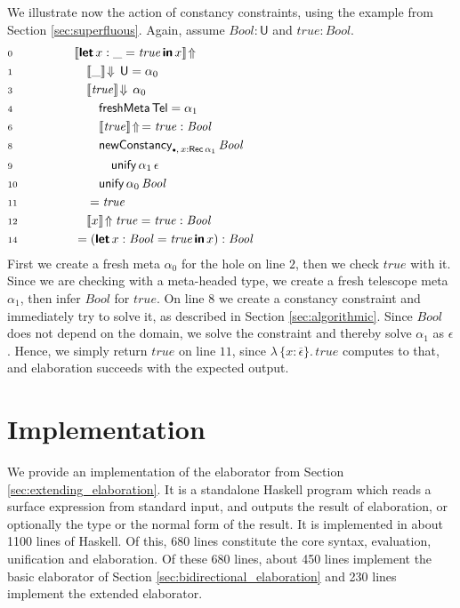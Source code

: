 \documentclass[acmsmall,review,anonymous,prologue,dvipsnames]{acmart}\settopmatter{printfolios=true,printccs=false,printacmref=false}
\newcommand{\slet}{\boldsymbol{\mathsf{let}}}
\renewcommand{\sin}{\boldsymbol{\mathsf{in}}}
\renewcommand{\U}{\mathsf{U}}
\newcommand{\emptycon}{\scaleobj{.75}\bullet}
\newcommand{\unify}{\mathsf{unify}}
\newcommand{\mi}[1]{\mathit{#1}}
\newcommand{\echeckt}[2]{\llbracket#1\rrbracket\!\Downarrow\,#2}
\newcommand{\einfert}[1]{\llbracket#1\rrbracket\!\Uparrow}
\newcommand{\Tel}{\mathsf{Tel}}
\newcommand{\Rec}{\mathsf{Rec}}
\newcommand{\ol}[1]{\overline{#1}}
\theoremstyle{remark}
\begin{document}
\begin{example}
We illustrate now the action of constancy constraints, using the example from
Section \ref{sec:superfluous}. Again, assume $\mi{Bool} : \U$ and $\mi{true} : \mi{Bool}$.
\begin{alignat*}{3}
& \scriptstyle{0}\qquad\qquad && \einfert{\slet\,x : \_ = \mi{true}\,\sin\,x}
      \hspace{21em}\\
& \scriptstyle{1} && \quad \echeckt{\_}{\U} = \alpha_0\\
& \scriptstyle{3} && \quad \echeckt{\mi{true}}{\alpha_0}\\
& \scriptstyle{4} && \qquad \mathsf{freshMeta}\,\Tel = \alpha_1\\
& \scriptstyle{6} && \qquad \einfert{\mi{true}}\,= \mi{true} : \mi{Bool}\\
& \scriptstyle{8} && \qquad \mathsf{newConstancy}_{\emptycon,\,x : \Rec\,\alpha_1}\,\mi{Bool}\\
& \scriptstyle{9} && \qquad\quad \unify\,\alpha_1\,\epsilon\\
& \scriptstyle{10} && \qquad \unify\,\alpha_0\,\mi{Bool}\\
& \scriptstyle{11} && \quad = \mi{true}\\
& \scriptstyle{12} && \quad \einfert{x}{\mi{true}} = \mi{true} : \mi{Bool}\\
& \scriptstyle{14} && = (\slet\,x : \mi{Bool} = \mi{true}\,\sin\,x) : \mi{Bool}
\end{alignat*}
First we create a fresh meta $\alpha_0$ for the hole on line $\scriptstyle{2}$,
then we check $\mi{true}$ with it. Since we are checking with a meta-headed type, we
create a fresh telescope meta $\alpha_1$, then infer $\mi{Bool}$ for
$\mi{true}$. On line $\scriptstyle{8}$ we create a constancy constraint and
immediately try to solve it, as described in Section
\ref{sec:algorithmic}. Since $\mi{Bool}$ does not depend on the domain, we solve
the constraint and thereby solve $\alpha_1$ as $\epsilon$. Hence, we simply
return $\mi{true}$ on line $\scriptstyle{11}$, since $\lambda\,\{x :
\ol{\epsilon}\}.\,\mi{true}$ computes to that, and elaboration succeeds with the
expected output.
\end{example}

\section{Implementation}
\label{sec:impl_and_eval}

We provide an implementation of the elaborator from Section
\ref{sec:extending_elaboration}. It is a standalone Haskell program which reads
a surface expression from standard input, and outputs the result of elaboration,
or optionally the type or the normal form of the result. It is implemented in
about 1100 lines of Haskell. Of this, 680 lines constitute the core syntax,
evaluation, unification and elaboration. Of these 680 lines, about 450 lines
implement the basic elaborator of Section \ref{sec:bidirectional_elaboration}
and 230 lines implement the extended elaborator.
\end{document}
